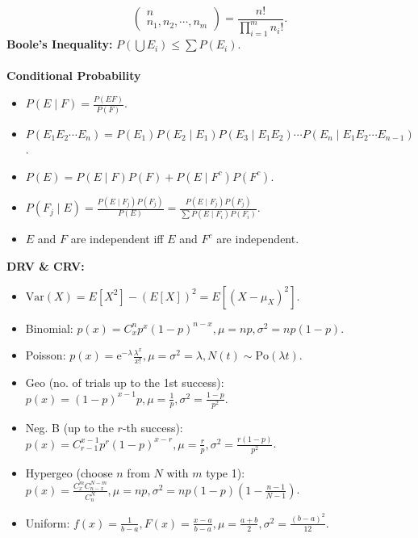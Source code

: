 \documentclass[9pt]{article}
\begin{document}
\begin{multicols*}{2}
\begin{equation*}
            \begin{pmatrix}
                n \\
                n_1, n_2, \cdots, n_m
            \end{pmatrix} = \frac{n!}{\prod_{i = 1}^{m}n_i!}.
        \end{equation*}
        \textbf{Boole's Inequality:} $P\left(\bigcup E_i\right) \leq \sum P(E_i)$.
        \\\\
        \textbf{Conditional Probability}
        \begin{itemize}
            \item $P(E \mid F) = \frac{P(EF)}{P(F)}$.
            \item $P(E_1E_2\cdots E_n) = P(E_1)P(E_2 \mid E_1)P(E_3 \mid E_1E_2)\cdots P(E_n \mid E_1E_2\cdots E_{n - 1})$.
            \item $P(E) = P(E \mid F)P(F) + P(E \mid F^c)P(F^c)$.
            \item $P(F_j \mid E) = \frac{P(E \mid F_j)P(F_j)}{P(E)} = \frac{P(E \mid F_j)P(F_j)}{\sum P(E \mid F_i)P(F_i)}$.
            \item $E$ and $F$ are independent iff $E$ and $F^c$ are independent.
        \end{itemize}
        \textbf{DRV \& CRV:}
        \begin{itemize}
            \item $\mathrm{Var}(X) = E[X^2] - (E[X])^2 = E[(X - \mu_X)^2]$.
            \item Binomial: $p(x) = C^n_xp^x(1 - p)^{n - x}, \mu = np, \sigma^2 = np(1 - p)$.
            \item Poisson: $p(x) = \mathrm{e}^{-\lambda}\frac{\lambda^x}{x!}, \mu = \sigma^2 = \lambda, N(t) \sim \mathrm{Po}(\lambda t)$.
            \item Geo (no. of trials up to the 1st success): $p(x) = (1 - p)^{x - 1}p, \mu = \frac{1}{p}, \sigma^2 = \frac{1 - p}{p^2}$.
            \item Neg. B (up to the $r$-th success): $p(x) = C^{x - 1}_{r - 1}p^r(1 - p)^{x - r}, \mu = \frac{r}{p}, \sigma^2 = \frac{r(1 - p)}{p^2}$.
            \item Hypergeo (choose $n$ from $N$ with $m$ type 1): $p(x) = \frac{C^m_xC^{N - m}_{n - x}}{C^N_n}, \mu = np, \sigma^2 = np(1 - p)\left(1 - \frac{n - 1}{N - 1}\right)$.
            \item Uniform: $f(x) = \frac{1}{b - a}, F(x) = \frac{x - a}{b - a}, \mu = \frac{a + b}{2}, \sigma^2 = \frac{(b - a)^2}{12}$.

\end{itemize}
\end{multicols*}
\end{document}

